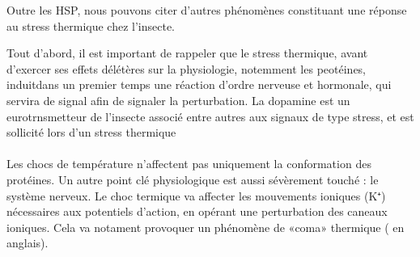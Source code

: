Outre les HSP, nous pouvons citer d'autres phénomènes constituant une réponse au stress thermique chez l'insecte.

Tout d'abord, il est important de rappeler que le stress thermique, avant d'exercer ses effets délétères sur la physiologie, notemment les peotéines, induitdans un premier temps une réaction d'ordre nerveuse et hormonale, qui servira de signal afin de signaler la perturbation.
La dopamine est un eurotrnsmetteur de l'insecte associé entre autres aux signaux de type stress, et est sollicité lors d'un stress thermique \cite{andersen2006}


\paragraph{}

Les chocs de température n'affectent pas uniquement la conformation des protéines.
Un autre point clé physiologique est aussi sévèrement touché : le système nerveux.
Le choc termique va affecter les mouvements ioniques (K⁺) nécessaires aux potentiels d'action, en opérant une perturbation des caneaux ioniques.
Cela va notament provoquer un phénomène de «coma» thermique ( en anglais).
